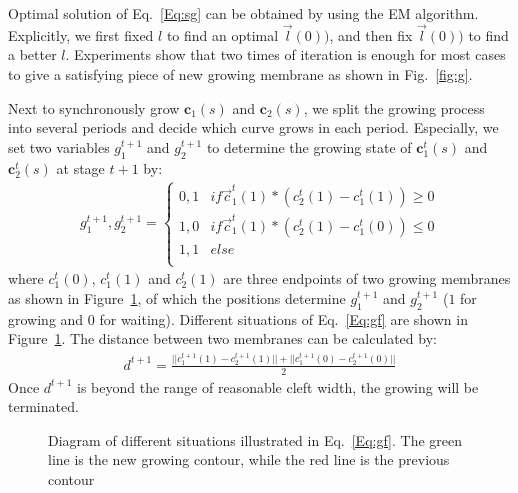 Optimal solution of Eq.~\ref{Eq:sg} can be obtained by using the EM algorithm.
Explicitly, we first fixed $l$ to find an optimal $\overrightarrow{l}(0))$, and then fix $\overrightarrow{l}(0))$ to find a better $l$.
Experiments show that two times of iteration is enough for most cases to give a satisfying piece of new growing membrane as shown in Fig.~\ref{fig:g}.

Next to synchronously grow $\mathbf{c}_1(s)$ and $\mathbf{c}_2(s)$, we split the growing process into several periods and decide which curve grows in each period.
Especially, we set two variables $g_1^{t+1}$ and $g_2^{t+1}$ to determine the growing state of $\mathbf{c}_1^{t}(s)$ and $\mathbf{c}_2^{t}(s)$ at stage $t+1$ by:
\begin{eqnarray}\label{Eq:gf}
g_1^{t+1},g_2^{t+1} = \left\{\begin{array}{cc}
0,1&if \overrightarrow{c}^t_1(1)*(c_2^t(1)-c_1^t(1))\geq 0 \\
1,0&if \overrightarrow{c}^t_1(1)*(c_2^t(1)-c_1^t(0))\leq 0\\
1,1& else\\
\end{array}\right.
\end{eqnarray}
where $c_1^t(0)$, $c_1^t(1)$ and $c_2^t(1)$ are three endpoints of two growing membranes as shown in Figure~\ref{fig:sg}, of which the positions determine $g_1^{t+1}$ and $g_2^{t+1}$ ($1$ for growing and $0$ for waiting).
Different situations of Eq.~\ref{Eq:gf} are shown in Figure~\ref{fig:sg}.
The distance between two membranes can be calculated by:
\begin{eqnarray}\label{Eq:d}
d^{t+1} = \frac{||c_1^{t+1}(1)-c_2^{t+1}(1)||+ ||c_1^{t+1}(0)-c_2^{t+1}(0)||}{2}
\end{eqnarray}
Once $d^{t+1}$ is beyond the range of reasonable cleft width, the growing will be terminated.
\begin{figure}[t]
\begin{minipage}[b]{1.0\linewidth}
  \centering
 \centerline{}
\end{minipage}
\caption{Diagram of different situations illustrated in Eq.~\ref{Eq:gf}.
        The green line is the new growing contour, while the red line is the previous contour}
\label{fig:sg}
\end{figure}